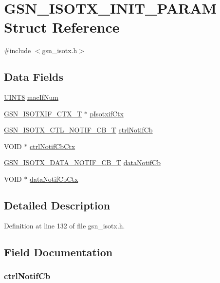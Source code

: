 \hypertarget{a00104}{
\section{GSN\_\-ISOTX\_\-INIT\_\-PARAM Struct Reference}
\label{a00104}
}


{\ttfamily \#include $<$gsn\_\-isotx.h$>$}

\subsection*{Data Fields}
\begin{DoxyCompactItemize}
\item 
\hyperlink{a00660_gab27e9918b538ce9d8ca692479b375b6a}{UINT8} \hyperlink{a00104_ae57ae92e651751e7978e237c55133b4c}{macIfNum}
\item 
\hyperlink{a00105}{GSN\_\-ISOTXIF\_\-CTX\_\-T} $\ast$ \hyperlink{a00104_afffdfa8aef1548f076e03123267d83d6}{pIsotxifCtx}
\item 
\hyperlink{a00520_a5fb480486e6585bd46bfcb3ad503bdd4}{GSN\_\-ISOTX\_\-CTL\_\-NOTIF\_\-CB\_\-T} \hyperlink{a00104_a60b2db161b0fa9d3ca570671b26ce93e}{ctrlNotifCb}
\item 
VOID $\ast$ \hyperlink{a00104_a6f33e042154bc2634628dd57ffde3e8d}{ctrlNotifCbCtx}
\item 
\hyperlink{a00520_ae9071f19d1fb2c67ee3777a8e1306727}{GSN\_\-ISOTX\_\-DATA\_\-NOTIF\_\-CB\_\-T} \hyperlink{a00104_a6f147a768d8d32582991e6f9126f2206}{dataNotifCb}
\item 
VOID $\ast$ \hyperlink{a00104_a1d09453c95fd5ccea2a75b244351d73b}{dataNotifCbCtx}
\end{DoxyCompactItemize}


\subsection{Detailed Description}


Definition at line 132 of file gsn\_\-isotx.h.



\subsection{Field Documentation}
\hypertarget{a00104_a60b2db161b0fa9d3ca570671b26ce93e}{
\subsubsection[{ctrlNotifCb}]{ {\bf ctrlNotifCb}}}
\label{a00104_a60b2db161b0fa9d3ca570671b26ce93e}


